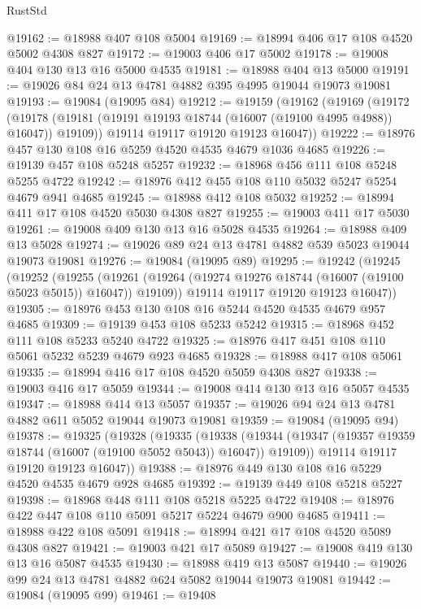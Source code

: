 \begin{lexlean}{RustStd}
\begin{coremodule}
@19162 := @18988 @407 @108 @5004
@19169 := @18994 @406 @17 @108 @4520 @5002 @4308 @827
@19172 := @19003 @406 @17 @5002
@19178 := @19008 @404 @130 @13 @16 @5000 @4535
@19181 := @18988 @404 @13 @5000
@19191 := @19026 @84 @24 @13 @4781 @4882 @395 @4995 @19044 @19073 @19081
@19193 := @19084 (@19095 @84)
@19212 := @19159
    (@19162
      (@19169
        (@19172
          (@19178 (@19181 (@19191 @19193 @18744 (@16007 (@19100 @4995 @4988)) @16047)) @19109))
        @19114
        @19117
        @19120
        @19123
        @16047))
@19222 := @18976 @457 @130 @108 @16 @5259 @4520 @4535 @4679 @1036 @4685
@19226 := @19139 @457 @108 @5248 @5257
@19232 := @18968 @456 @111 @108 @5248 @5255 @4722
@19242 := @18976 @412 @455 @108 @110 @5032 @5247 @5254 @4679 @941 @4685
@19245 := @18988 @412 @108 @5032
@19252 := @18994 @411 @17 @108 @4520 @5030 @4308 @827
@19255 := @19003 @411 @17 @5030
@19261 := @19008 @409 @130 @13 @16 @5028 @4535
@19264 := @18988 @409 @13 @5028
@19274 := @19026 @89 @24 @13 @4781 @4882 @539 @5023 @19044 @19073 @19081
@19276 := @19084 (@19095 @89)
@19295 := @19242
    (@19245
      (@19252
        (@19255
          (@19261 (@19264 (@19274 @19276 @18744 (@16007 (@19100 @5023 @5015)) @16047)) @19109))
        @19114
        @19117
        @19120
        @19123
        @16047))
@19305 := @18976 @453 @130 @108 @16 @5244 @4520 @4535 @4679 @957 @4685
@19309 := @19139 @453 @108 @5233 @5242
@19315 := @18968 @452 @111 @108 @5233 @5240 @4722
@19325 := @18976 @417 @451 @108 @110 @5061 @5232 @5239 @4679 @923 @4685
@19328 := @18988 @417 @108 @5061
@19335 := @18994 @416 @17 @108 @4520 @5059 @4308 @827
@19338 := @19003 @416 @17 @5059
@19344 := @19008 @414 @130 @13 @16 @5057 @4535
@19347 := @18988 @414 @13 @5057
@19357 := @19026 @94 @24 @13 @4781 @4882 @611 @5052 @19044 @19073 @19081
@19359 := @19084 (@19095 @94)
@19378 := @19325
    (@19328
      (@19335
        (@19338
          (@19344 (@19347 (@19357 @19359 @18744 (@16007 (@19100 @5052 @5043)) @16047)) @19109))
        @19114
        @19117
        @19120
        @19123
        @16047))
@19388 := @18976 @449 @130 @108 @16 @5229 @4520 @4535 @4679 @928 @4685
@19392 := @19139 @449 @108 @5218 @5227
@19398 := @18968 @448 @111 @108 @5218 @5225 @4722
@19408 := @18976 @422 @447 @108 @110 @5091 @5217 @5224 @4679 @900 @4685
@19411 := @18988 @422 @108 @5091
@19418 := @18994 @421 @17 @108 @4520 @5089 @4308 @827
@19421 := @19003 @421 @17 @5089
@19427 := @19008 @419 @130 @13 @16 @5087 @4535
@19430 := @18988 @419 @13 @5087
@19440 := @19026 @99 @24 @13 @4781 @4882 @624 @5082 @19044 @19073 @19081
@19442 := @19084 (@19095 @99)
@19461 := @19408

\end{coremodule}
\end{lexlean}
